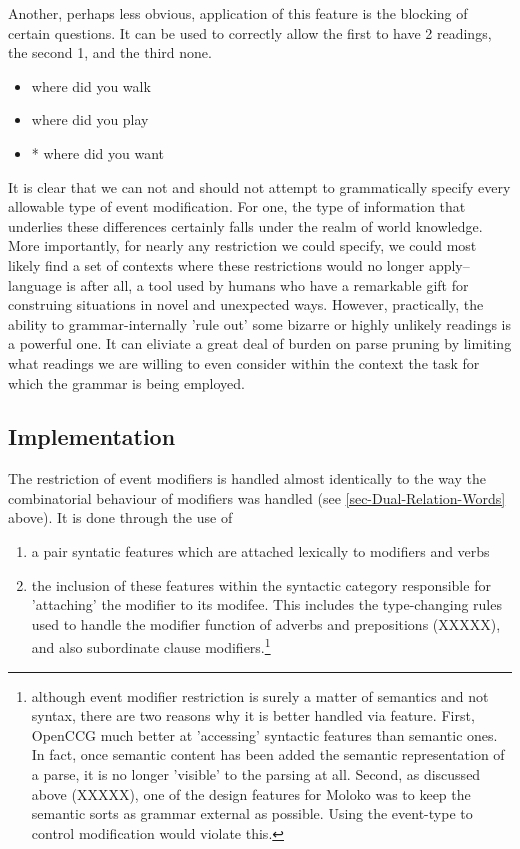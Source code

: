 Another, perhaps less obvious, application of this feature is the blocking of certain questions.  It can be used to correctly allow the first to have 2 readings, the second 1, and the third none. 
\begin{itemize}
\item where did you walk
\item where did you play
\item * where did you want
\end{itemize}

It is clear that we can not and should not attempt to grammatically specify every allowable type of event modification. For one, the type of information that underlies these differences certainly falls under the realm of world knowledge. More importantly, for nearly any restriction we could specify, we could most likely find a set of contexts where these restrictions would no longer apply--language is after all, a tool used by humans who have a remarkable gift for construing situations in novel and unexpected ways. However, practically, the ability to grammar-internally 'rule out' some bizarre or highly unlikely readings is a powerful one. It can eliviate a great deal of burden on parse pruning by limiting what readings we are willing to even consider within the context the task for which the grammar is being employed.

\subsection{Implementation}	

The restriction of event modifiers is handled almost identically to the way the combinatorial behaviour of modifiers was handled (see \ref{sec-Dual-Relation-Words} above). It is done through the use of 
\begin{enumerate}
\item  a pair syntatic features which are attached lexically to modifiers and verbs
\item  the inclusion of these features within the syntactic category responsible for 'attaching' the  modifier to its modifee. This includes the type-changing rules used to handle  the modifier function of adverbs and prepositions (XXXXX), and also subordinate clause modifiers.\footnote{although event modifier restriction is surely a matter of semantics and not syntax, there are two reasons why it is better handled via feature. First, OpenCCG  much better at 'accessing' syntactic features than semantic ones. In fact, once semantic content has been added the semantic representation of a parse, it is no longer 'visible' to the parsing at all. Second, as discussed above (XXXXX), one of the design features for Moloko was to keep the semantic sorts as grammar external as possible. Using the event-type to control modification would violate this.}
\end{enumerate}
